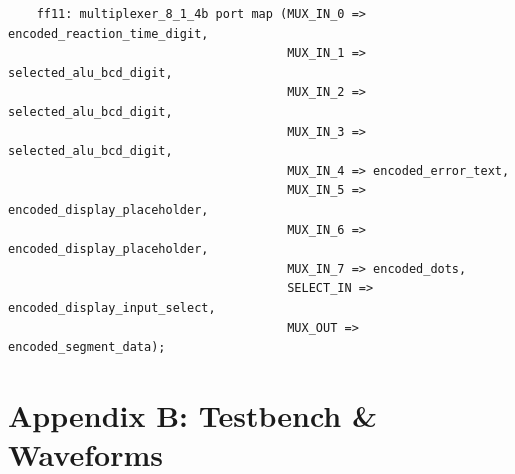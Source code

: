 \documentclass[11pt]{article}
\newenvironment{code}{\captionsetup{type=listing}}{}
\begin{document}
\begin{code}
  \begin{verbatim}
    ff11: multiplexer_8_1_4b port map (MUX_IN_0 => encoded_reaction_time_digit,
                                       MUX_IN_1 => selected_alu_bcd_digit,
                                       MUX_IN_2 => selected_alu_bcd_digit,
                                       MUX_IN_3 => selected_alu_bcd_digit,
                                       MUX_IN_4 => encoded_error_text,
                                       MUX_IN_5 => encoded_display_placeholder,
                                       MUX_IN_6 => encoded_display_placeholder,
                                       MUX_IN_7 => encoded_dots,
                                       SELECT_IN => encoded_display_input_select,
                                       MUX_OUT => encoded_segment_data);
  \end{verbatim}
  \captionsetup{belowskip=0pt}
  \label{code:output_select_mux_instantiation}
\end{code}

\newpage

\section{Appendix B: Testbench \& Waveforms}
\end{document}
